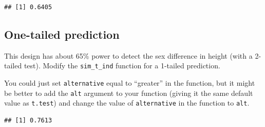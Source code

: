 \documentclass[
  oneside]{book}
\newenvironment{Shaded}{\begin{snugshade}}{\end{snugshade}}
\newcommand{\AttributeTok}[1]{\textcolor[rgb]{0.77,0.63,0.00}{#1}}
\newcommand{\ConstantTok}[1]{\textcolor[rgb]{0.00,0.00,0.00}{#1}}
\newcommand{\ControlFlowTok}[1]{\textcolor[rgb]{0.13,0.29,0.53}{\textbf{#1}}}
\newcommand{\DecValTok}[1]{\textcolor[rgb]{0.00,0.00,0.81}{#1}}
\newcommand{\FloatTok}[1]{\textcolor[rgb]{0.00,0.00,0.81}{#1}}
\newcommand{\FunctionTok}[1]{\textcolor[rgb]{0.00,0.00,0.00}{#1}}
\newcommand{\NormalTok}[1]{#1}
\newcommand{\OtherTok}[1]{\textcolor[rgb]{0.56,0.35,0.01}{#1}}
\newcommand{\SpecialCharTok}[1]{\textcolor[rgb]{0.00,0.00,0.00}{#1}}
\newcommand{\StringTok}[1]{\textcolor[rgb]{0.31,0.60,0.02}{#1}}
\begin{document}
\begin{verbatim}
## [1] 0.6405
\end{verbatim}

\hypertarget{one-tailed-prediction}{%
\subsection{One-tailed prediction}\label{one-tailed-prediction}}

This design has about 65\% power to detect the sex difference in height (with a 2-tailed test). Modify the \texttt{sim\_t\_ind} function for a 1-tailed prediction.

You could just set \texttt{alternative} equal to ``greater'' in the function, but it might be better to add the \texttt{alt} argument to your function (giving it the same default value as \texttt{t.test}) and change the value of \texttt{alternative} in the function to \texttt{alt}.

\begin{Shaded}
\end{Shaded}

\begin{verbatim}
## [1] 0.7613
\end{verbatim}
\end{document}
